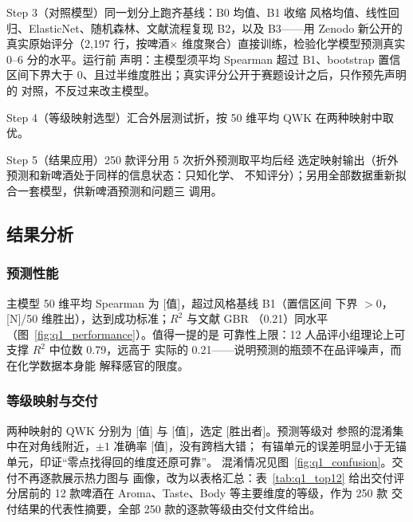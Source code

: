 \documentclass[12pt,a4paper]{article}
\begin{document}
Step 3（对照模型）同一划分上跑齐基线：B0 均值、B1 收缩
风格均值、线性回归、ElasticNet、随机森林、文献流程复现 B2，以及
B3——用 Zenodo 新公开的真实原始评分（2{,}197 行，按啤酒$\times$
维度聚合）直接训练，检验化学模型预测真实 0--6 分的水平。运行前
声明：主模型须平均 Spearman 超过 B1、bootstrap 置信区间下界大于
0、且过半维度胜出；真实评分公开于赛题设计之后，只作预先声明的
对照，不反过来改主模型。

Step 4（等级映射选型）汇合外层测试折，按 50 维平均 QWK
在两种映射中取优。

Step 5（结果应用）250 款评分用 5 次折外预测取平均后经
选定映射输出（折外预测和新啤酒处于同样的信息状态：只知化学、
不知评分）；另用全部数据重新拟合一套模型，供新啤酒预测和问题三
调用。

\subsection{结果分析}

\subsubsection{预测性能}

主模型 50 维平均 Spearman 为 [值]，超过风格基线 B1（置信区间
下界 $>0$，[N]/50 维胜出），达到成功标准；$R^2$ 与文献 GBR
（0.21）同水平（图~\ref{fig:q1_performance}）。值得一提的是
可靠性上限：12 人品评小组理论上可支撑 $R^2$ 中位数 0.79，远高于
实际的 0.21——说明预测的瓶颈不在品评噪声，而在化学数据本身能
解释感官的限度。


\subsubsection{等级映射与交付}

两种映射的 QWK 分别为 [值] 与 [值]，选定 [胜出者]。预测等级对
参照的混淆集中在对角线附近，$\pm1$ 准确率 [值]，没有跨档大错；
有锚单元的误差明显小于无锚单元，印证``零点找得回的维度还原可靠''。
混淆情况见图~\ref{fig:q1_confusion}。交付不再逐款展示热力图与
画像，改为以表格汇总：表~\ref{tab:q1_top12} 给出交付评分居前的
12 款啤酒在 Aroma、Taste、Body 等主要维度的等级，作为 250 款
交付结果的代表性摘要，全部 250 款的逐款等级由交付文件给出。
\end{document}

